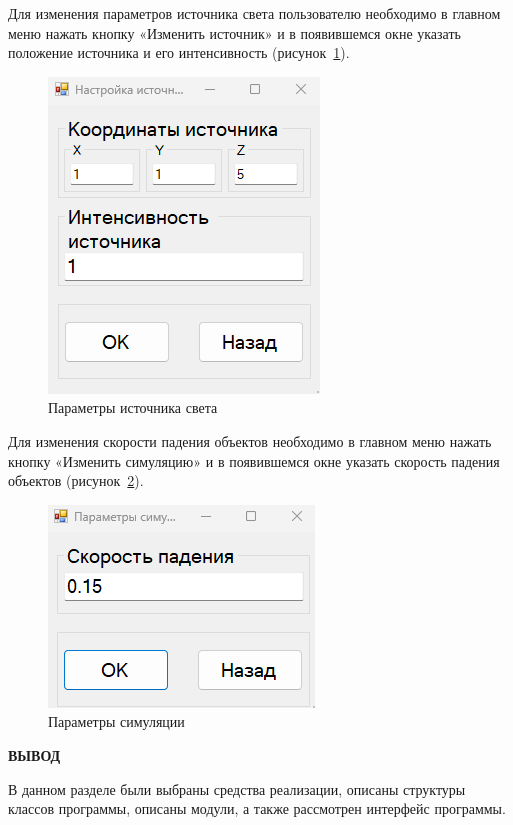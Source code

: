 Для изменения параметров источника света пользователю необходимо в главном меню нажать кнопку «Изменить источник» и в появившемся окне указать положение источника и его интенсивность (рисунок~\ref{fig:int-5}).

\begin{figure}[h!]
    \centering
    \includegraphics[width=0.15\linewidth]{img/int-5.png}
    \caption{Параметры источника света}
    \label{fig:int-5}
\end{figure}

Для изменения скорости падения объектов необходимо в главном меню нажать кнопку «Изменить симуляцию» и в появившемся окне указать скорость падения объектов (рисунок~\ref{fig:int-6}).

\begin{figure}[h!]
    \centering
    \includegraphics[width=0.15\linewidth]{img/int-6.png}
    \caption{Параметры симуляции}
    \label{fig:int-6}
\end{figure}


\textbf{ВЫВОД}

В данном разделе были выбраны средства реализации, описаны структуры классов программы, описаны модули, а также рассмотрен интерфейс
программы.

\clearpage